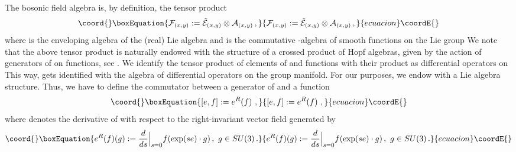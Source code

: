 \documentclass[a4paper,12pt]{article}
\begin{document}
The bosonic field algebra \coordHE{} is, by definition,
the tensor product
\begin{equation}\coord{}\boxEquation{
\label{balgebra-xy} {\cal F}_{(x,y)} :=  \tilde{\cal E}_{(x,y)}
\otimes {\cal A}_{(x,y)} \, ,
}{
{\cal F}_{(x,y)} :=  \tilde{\cal E}_{(x,y)}
\otimes {\cal A}_{(x,y)} \, ,
}{ecuacion}\coordE{}\end{equation}
where \coordHE{} is the enveloping algebra of the
(real) Lie algebra \coordHE{} and \coordHE{} is the commutative \myHighlight{$*$}\coordHE{}-algebra
of smooth functions on the Lie group \coordHE{} We note that the
above tensor product is naturally endowed with the structure of a
crossed product of Hopf algebras, given by the action of
generators of \coordHE{} on functions, see
\cite{KS}. We identify the tensor product of elements of
\coordHE{} and functions with their product as
differential operators on \coordHE{} This way, \coordHE{} gets identified with the algebra of differential
operators on the group manifold. For our purposes, we endow \coordHE{} with a Lie algebra structure. Thus, we have to define
the commutator between a generator \coordHE{} of
\coordHE{} and a function \coordHE{}
\begin{equation}\coord{}\boxEquation{
\label{commut-e-f} [e , f ] := e^R(f)  \ ,
}{
[e , f ] := e^R(f)  \ ,
}{ecuacion}\coordE{}\end{equation}
where \coordHE{} denotes the derivative of \coordHE{} with respect to the
right-invariant vector field \coordHE{} generated by \coordHE{}
\begin{equation}\coord{}\boxEquation{\label{derivative}
e^R(f)(g) := \frac d{ds}{\Big |}_{s=0} f(\exp (se)\cdot g) \, , \,
\, g \in SU(3) \, .
}{e^R(f)(g) := \frac d{ds}{\Big |}_{s=0} f(\exp (se)\cdot g) \, , \,
\, g \in SU(3) \, .
}{ecuacion}\coordE{}\end{equation}
\end{document}
